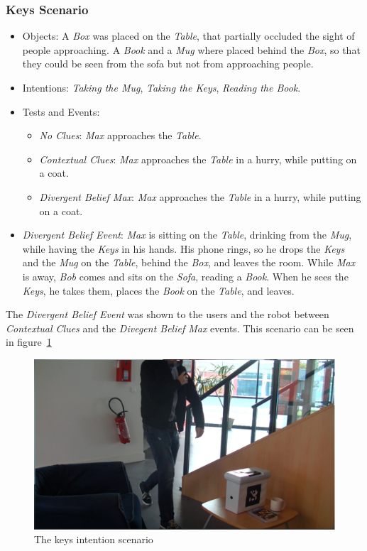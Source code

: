 \subsubsection{Keys Scenario}
\begin{itemize}
\item Objects: A \textit{Box} was placed on the \textit{Table}, that partially occluded the sight of people approaching. A \textit{Book} and a \textit{Mug} where placed behind the \textit{Box}, so that they could be seen from the sofa but not from approaching people.
\item Intentions: \textit{Taking the Mug}, \textit{Taking the Keys}, \textit{Reading the Book}.
\item Tests and Events:
\begin{itemize}
\item \textit{No Clues}: \textit{Max} approaches the \textit{Table}.
\item\textit{Contextual Clues}: \textit{Max} approaches the \textit{Table} in a hurry, while putting on a coat.
\item \textit{Divergent Belief Max}: \textit{Max} approaches the \textit{Table} in a hurry, while putting on a coat.
\end{itemize}
\item \textit{Divergent Belief Event}: \textit{Max} is sitting on the \textit{Table}, drinking from the \textit{Mug}, while having the \textit{Keys} in his hands. His phone rings, so he drops the \textit{Keys} and the \textit{Mug} on the \textit{Table}, behind the \textit{Box}, and leaves the room. While \textit{Max} is away, \textit{Bob} comes and sits on the \textit{Sofa}, reading a \textit{Book}. When he sees the \textit{Keys}, he takes them, places the \textit{Book} on the \textit{Table}, and leaves.
\end{itemize}

The \textit{Divergent Belief Event} was shown to the users and the robot between \textit{Contextual Clues} and the \textit{Divegent Belief Max} events. This scenario can be seen in figure~\ref{fig:situation_assessment-keys}

 \begin{figure}[ht!]
	\centering
	\includegraphics[scale=0.5]{img/situation_assessment/keys2-blur.pdf}
	\caption{The keys intention scenario}
	\label{fig:situation_assessment-keys}
\end{figure}

